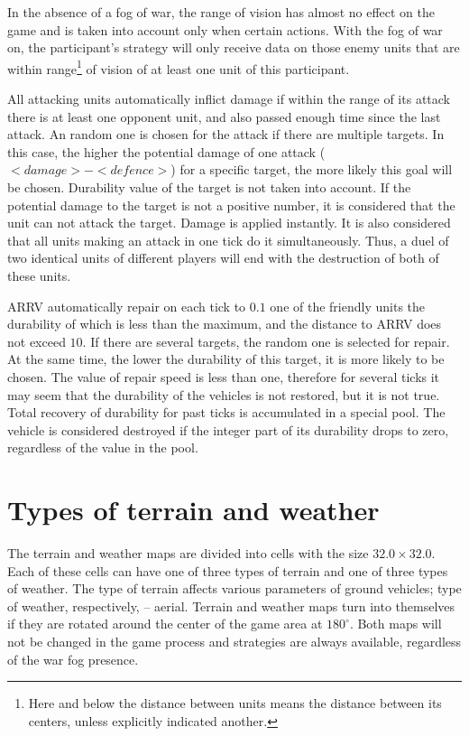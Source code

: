 In the absence of a fog of war, the range of vision has almost no effect on the game and is taken into account only when certain
actions. With the fog of war on, the participant’s strategy will only receive data on those enemy units that are within
range\footnote[2]{Here and below the distance between units means the distance between its centers, unless explicitly indicated
another.} of vision of at least one unit of this participant.

All attacking units automatically inflict damage if within the range of its attack there is at least one opponent unit, and also passed
enough time since the last attack. An random one is chosen for the attack if there are multiple targets. In this case, the higher
the potential damage of one attack ($<damage> - <defence>$) for a specific target, the more likely this goal will be chosen. Durability value of the target is not taken into account. If the potential damage to the target is not a positive number, it is considered that the unit can not attack
 the target. Damage is applied instantly. It is also considered that all units making an attack in one tick do it simultaneously. Thus, a duel
of two identical units of different players will end with the destruction of both of these units.

ARRV automatically repair on each tick to $0.1$ one of the friendly units the durability of which is less than the maximum, and the distance to
ARRV does not exceed $10$. If there are several targets, the random one is selected for repair. At the same time, the lower the durability of this target, it is more likely to be chosen. The value of repair speed is less than one, therefore for several ticks it may seem that
the durability of the vehicles is not restored, but it is not true. Total recovery of durability for past ticks is accumulated in a special
pool. The vehicle is considered destroyed if the integer part of its durability drops to zero, regardless of the value in the pool.

\section{Types of terrain and weather}

The terrain and weather maps are divided into cells with the size $32.0\times32.0$. Each of these cells can have one of three types of terrain
and one of three types of weather. The type of terrain affects various parameters of ground vehicles; type of weather, respectively, -- aerial. 
Terrain and weather maps turn into themselves if they are rotated around the center of the game area at $180^\circ$. Both maps will not be changed in
the game process and strategies are always available, regardless of the war fog presence.

